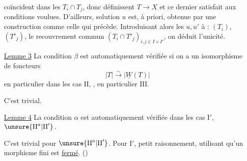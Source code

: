 coïncident dans les $T_i\cap T_j$, donc définissent
$T\to X$ et ce dernier satisfait aux conditions voulues.
D'ailleurs,  solution $u$ est, à priori, obtenue
par une construction comme celle qui précède.
Introduisant alors les  $u,u'$  à :
$(T_i)$, $(T'_j)$, le recouvrement commun $(T_i\cap T'_j)_{i,j\in I\times I'}$,
on déduit l'unicité.

\uline{Lemme 3} La condition $\beta$ est automatiquement vérifiée
si on a un isomorphisme de foncteurs
\[
|T|\xrightarrow{\sim}|\underline W(T)|
\]
en particulier dans les cas $\mathrm{II}$, ,
en particulier $\mathrm{III}$.

C'est trivial.

\uline{Lemme 4} La condition $\alpha$ est automatiquement
vérifiée dans les cas $\mathrm{I}'$, $\unsure{\mathrm{II}^{a}|\mathrm{II}'}$.

C'est trivial pour $\unsure{\mathrm{II}^{a}|\mathrm{II}'}$.
Pour $\mathrm{I}'$, petit raisonnement, utilisant qu'un morphisme
fini est \uline{fermé}. ()
